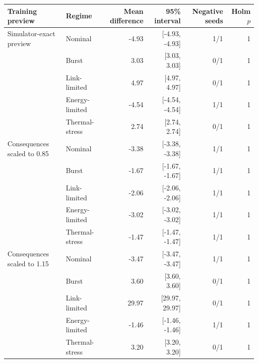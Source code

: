 \begin{tabular}{llrrrr}
\toprule
Training preview & Regime & Mean difference & 95\% interval & Negative seeds & Holm $p$ \\
\midrule
Simulator-exact preview & Nominal & -4.93 & [-4.93, -4.93] & 1/1 & 1 \\
 & Burst & 3.03 & [3.03, 3.03] & 0/1 & 1 \\
 & Link-limited & 4.97 & [4.97, 4.97] & 0/1 & 1 \\
 & Energy-limited & -4.54 & [-4.54, -4.54] & 1/1 & 1 \\
 & Thermal-stress & 2.74 & [2.74, 2.74] & 0/1 & 1 \\
\addlinespace
Consequences scaled to 0.85 & Nominal & -3.38 & [-3.38, -3.38] & 1/1 & 1 \\
 & Burst & -1.67 & [-1.67, -1.67] & 1/1 & 1 \\
 & Link-limited & -2.06 & [-2.06, -2.06] & 1/1 & 1 \\
 & Energy-limited & -3.02 & [-3.02, -3.02] & 1/1 & 1 \\
 & Thermal-stress & -1.47 & [-1.47, -1.47] & 1/1 & 1 \\
\addlinespace
Consequences scaled to 1.15 & Nominal & -3.47 & [-3.47, -3.47] & 1/1 & 1 \\
 & Burst & 3.60 & [3.60, 3.60] & 0/1 & 1 \\
 & Link-limited & 29.97 & [29.97, 29.97] & 0/1 & 1 \\
 & Energy-limited & -1.46 & [-1.46, -1.46] & 1/1 & 1 \\
 & Thermal-stress & 3.20 & [3.20, 3.20] & 0/1 & 1 \\
\bottomrule
\end{tabular}